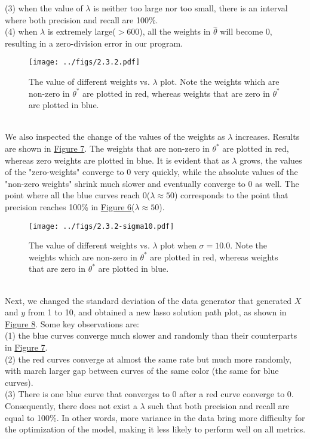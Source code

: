 \documentclass{article}
\begin{document}
        (3) when the value of $\lambda$ is neither too large nor too small, there is an interval where both precision and recall are 100\%.\\
        (4) when $\lambda$ is extremely large($>600$), all the weights in $\hat{\theta}$ will become 0, resulting in a zero-division error in our program.
        \begin{figure}[hbt!]
            \centering
            \texttt{[image: ../figs/2.3.2.pdf]}
            \caption{The value of different weights vs. $\lambda$ plot. 
            Note the weights which are non-zero in $\theta^{*}$ are plotted in red, 
            whereas weights that are zero in $\theta^{*}$ are plotted in blue.}
            \label{fig:2.3.2}
        \end{figure}\\
        We also inspected the change of the values of the weights as $\lambda$ increases. Results are shown in \hyperref[fig:2.3.2]{Figure 7}.
        The weights that are non-zero in $\theta^{*}$ are plotted in red, whereas zero weights are plotted in blue.
        It is evident that as $\lambda$ grows, the values of the "zero-weights" converge to 0 very quickly,
        while the absolute values of the "non-zero weights" shrink much slower and eventually converge to 0 as well.
        The point where all the blue curves reach 0($\lambda\approx 50$) corresponds to the point that precision reaches 100\% in \hyperref[fig:2.3.1]{Figure 6}($\lambda\approx 50$).
        \begin{figure}[hbt!]
            \centering
            \texttt{[image: ../figs/2.3.2-sigma10.pdf]}
            \caption{The value of different weights vs. $\lambda$ plot when $\sigma=10.0$. 
            Note the weights which are non-zero in $\theta^{*}$ are plotted in red, 
            whereas weights that are zero in $\theta^{*}$ are plotted in blue.}
            \label{fig:2.3.3}
        \end{figure}\\
        Next, we changed the standard deviation of the data generator that generated $X$ and $y$ from 1 to 10,
        and obtained a new lasso solution path plot, as shown in \hyperref[fig:2.3.3]{Figure 8}.
        Some key observations are:\\
        (1) the blue curves converge much slower and randomly than their counterparts in \hyperref[fig:2.3.2]{Figure 7}.\\
        (2) the red curves converge at almost the same rate but much more randomly, with march larger gap between curves of the same color (the same for blue curves).\\
        (3) There is one blue curve that converges to 0 after a red curve converge to 0.
        Consequently, there does not exist a $\lambda$ such that both precision and recall are equal to 100\%.
        In other words, more variance in the data bring more difficulty for the optimization of the model, making it less likely to perform well on all metrics.
\end{document}
